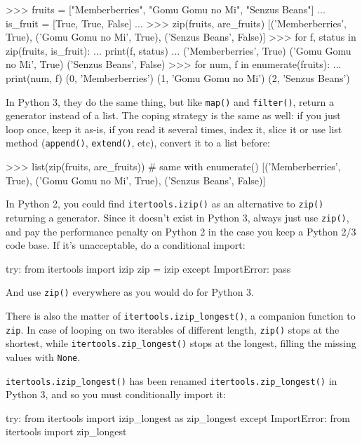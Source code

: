 \begin{py2}
>>> fruits = ["Memberberries", "Gomu Gomu no Mi", "Senzus Beans"]
... is_fruit = [True, True, False]
...
>>> zip(fruits, are_fruits)
[('Memberberries', True), ('Gomu Gomu no Mi', True), ('Senzus Beans', False)]
>>> for f, status in zip(fruits, is_fruit):
...     print(f, status)
...
('Memberberries', True)
('Gomu Gomu no Mi', True)
('Senzus Beans', False)
>>> for num, f in enumerate(fruits):
...     print(num, f)
(0, 'Memberberries')
(1, 'Gomu Gomu no Mi')
(2, 'Senzus Beans')
\end{py2}

In Python 3, they do the same thing, but like \lstinline{map()} and \lstinline{filter()}, return a generator instead of a list. The coping strategy is the same as well: if you just loop once, keep it as-is, if you read it several times, index it, slice it or use list method (\lstinline{append()}, \lstinline{extend()}, etc), convert it to a list before:

\begin{py2and3}
>>> list(zip(fruits, are_fruits)) # same with enumerate()
[('Memberberries', True), ('Gomu Gomu no Mi', True), ('Senzus Beans', False)]
\end{py2and3}

In Python 2, you could find \lstinline{itertools.izip()} as an alternative to \lstinline{zip()} returning a generator. Since it doesn't exist in Python 3, always just use \lstinline{zip()}, and pay the performance penalty on Python 2 in the case you keep a Python 2/3 code base. If it's unacceptable, do a conditional import:

\begin{py2and3}
try:
    from itertools import izip
    zip = izip
except ImportError:
    pass
\end{py2and3}

And use \lstinline{zip()} everywhere as you would do for Python 3.

There is also the matter of \lstinline{itertools.izip_longest()}, a companion function to \lstinline{zip}. In case of looping on two iterables of different length, \lstinline{zip()} stops at the shortest, while \lstinline{itertools.zip_longest()} stops at the longest, filling the missing values with \lstinline{None}.

\lstinline{itertools.izip_longest()} has been renamed \lstinline{itertools.zip_longest()} in Python 3, and so you must conditionally import it:

\begin{py2and3}
try:
    from itertools import izip_longest as zip_longest
except ImportError:
    from itertools import zip_longest
\end{py2and3}

